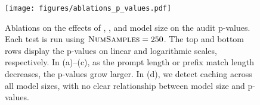\begin{figure}[p]
    \centering
    \texttt{[image: figures/ablations\_p\_values.pdf]}
    \vspace{-0.1in}
    \caption{
        Ablations on the effects of \PromptLength{}, \PrefixFraction{}, and model size on the audit p-values. Each test is run using $\textsc{NumSamples} = 250$. The top and bottom rows display the p-values on linear and logarithmic scales, respectively. In (a)--(c), as the prompt length or prefix match length decreases, the p-values grow larger. In (d), we detect caching across all model sizes, with no clear relationship between model size and p-values.
    }
    \label{fig:ablations-p-values}
\end{figure}
